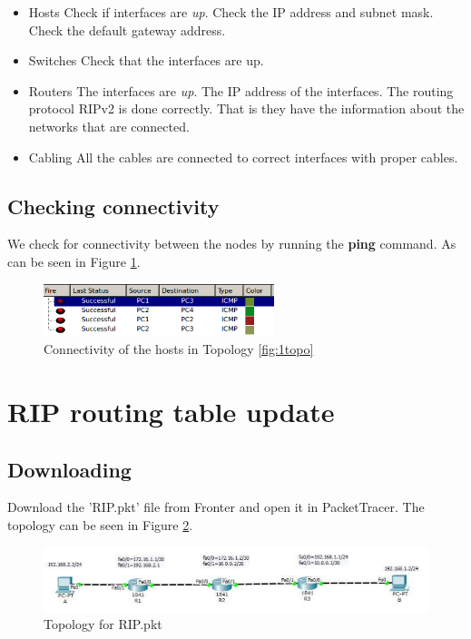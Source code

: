 \documentclass{article}
\begin{document}
\begin{itemize}
\item Hosts 
    \subitem Check if interfaces are \textit{up}.
    \subitem Check the IP address and subnet mask.
    \subitem Check the default gateway address.
\item Switches
    \subitem Check that the interfaces are up.
\item Routers
    \subitem The interfaces are \textit{up}.
    \subitem The IP address of the interfaces.
    \subitem The routing protocol RIPv2 is done correctly. That is they have the information about the networks that are connected. 
\item Cabling 
    \subitem All the cables are connected to correct interfaces with proper cables.
\end{itemize}


\subsection{Checking connectivity}

We check for connectivity between the nodes by running the \textbf{ping} command. As can be seen in Figure \ref{fig:1ping}. 

\begin{figure}
    \centering
    \includegraphics[width=0.6\textwidth]{1ping}
    \caption{Connectivity of the hosts in Topology \ref{fig:1topo}}
    \label{fig:1ping}
\end{figure}

\section{RIP routing table update}

\subsection{Downloading}

Download the 'RIP.pkt' file from Fronter and open it in PacketTracer.
The topology can be seen in Figure \ref{fig:2topo}.

\begin{figure}[h]
    \centering
    \includegraphics[width=\textwidth]{2topo}
    \caption{Topology for RIP.pkt}
    \label{fig:2topo}
\end{figure}
\end{document}
